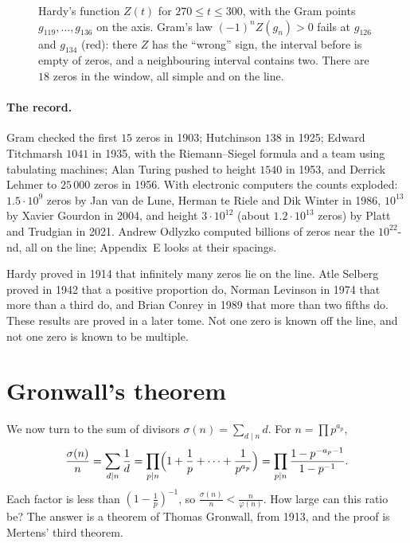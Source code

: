 \begin{figure}[ht]
\centering
{}
\caption{Hardy's function $Z(t)$ for $270\le t\le300$, with the Gram points $g_{119},\dots,g_{136}$ on the axis. Gram's law $(-1)^nZ(g_n)>0$ fails at
$g_{126}$ and $g_{134}$ (red): there $Z$ has the ``wrong'' sign, the interval before is empty of zeros, and a neighbouring interval contains two. There
are $18$ zeros in the window, all simple and on the line.}
\label{conjectures:fig:gram}
\end{figure}

\paragraph{The record.} Gram checked the first $15$ zeros in 1903; Hutchinson $138$ in 1925; Edward Titchmarsh $1041$ in 1935, with the Riemann--Siegel
formula and a team using tabulating machines; Alan Turing pushed to height $1540$ in 1953, and Derrick Lehmer to $25\,000$ zeros in 1956. With
electronic computers the counts exploded: $1.5\cdot10^9$ zeros by Jan van de Lune, Herman te Riele and Dik Winter in 1986, $10^{13}$ by Xavier Gourdon in
2004, and height $3\cdot10^{12}$ (about $1.2\cdot10^{13}$ zeros) by Platt and Trudgian in 2021. Andrew Odlyzko computed billions of zeros near the
$10^{22}$-nd, all on the line; Appendix~E looks at their spacings.

\begin{remark}\label{conjectures:rem:hardy}
Hardy proved in 1914 that infinitely many zeros lie on the line. Atle Selberg proved in 1942 that a positive proportion do, Norman Levinson in 1974
that more than a third do, and Brian Conrey in 1989 that more than two fifths do. These results are proved in a later tome. Not one zero is known off the line,
and not one zero is known to be multiple.
\end{remark}

\section{Gronwall's theorem}

We now turn to the sum of divisors $\sigma(n)=\sum_{d\mid n}d$. For $n=\prod p^{a_p}$,
\[
\frac{\sigma(n)}n=\sum_{d\mid n}\frac1d=\prod_{p\mid n}\Bigl(1+\frac1p+\dots+\frac1{p^{a_p}}\Bigr)=\prod_{p\mid n}\frac{1-p^{-a_p-1}}{1-p^{-1}}.
\]
Each factor is less than $(1-\frac1p)^{-1}$, so $\frac{\sigma(n)}n<\frac n{\varphi(n)}$. How large can this ratio be? The answer is a theorem of Thomas
Gronwall, from 1913, and the proof is Mertens' third theorem.

